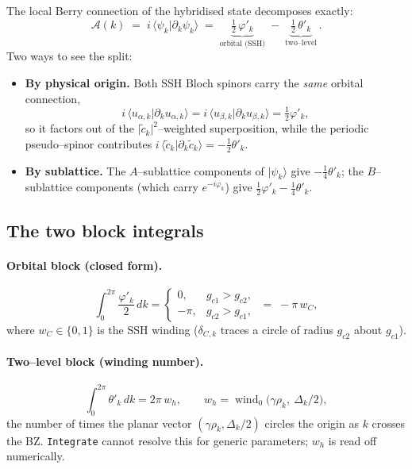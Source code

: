 \documentclass[11pt]{article}
\newcommand{\dC}{\delta_{C,k}}
\newcommand{\ph}{\varphi_k}
\newcommand{\ket}[1]{\lvert #1 \rangle}
\newcommand{\ip}[2]{\langle #1 \vert #2 \rangle}
\newcommand{\wC}{w_C}
\newcommand{\wh}{w_h}
\DeclareMathOperator{\wind}{wind}
\begin{document}
The local Berry connection of the hybridised state decomposes exactly:
\begin{equation}\label{eq:Ablocks}
  \boxed{\;
  \mathcal A(k)\;=\;i\,\ip{\psi_k}{\partial_k\psi_k}
   \;=\;\underbrace{\tfrac12\,\varphi'_k}_{\text{orbital (SSH)}}
   \;-\;\underbrace{\tfrac12\,\theta'_k}_{\text{two--level}}\,.
  \;}
\end{equation}
Two ways to see the split:
\begin{itemize}
  \item \textbf{By physical origin.} Both SSH Bloch spinors carry the \emph{same}
        orbital connection,
        \[
          i\,\ip{u_{\alpha,k}}{\partial_k u_{\alpha,k}}
          = i\,\ip{u_{\beta,k}}{\partial_k u_{\beta,k}}
          = \tfrac12\varphi'_k ,
        \]
        so it factors out of the $\lvert\tilde c_k\rvert^{2}$--weighted
        superposition, while the periodic pseudo--spinor contributes
        $i\,\ip{\tilde c_k}{\partial_k\tilde c_k}=-\tfrac12\theta'_k$.
  \item \textbf{By sublattice.} The $A$--sublattice components of $\ket{\psi_k}$
        give $-\tfrac14\theta'_k$; the $B$--sublattice components (which carry
        $e^{-i\ph}$) give $\tfrac12\varphi'_k-\tfrac14\theta'_k$.
\end{itemize}

\subsection{The two block integrals}

\paragraph{Orbital block (closed form).}
\begin{equation}\label{eq:orbint}
  \int_{0}^{2\pi}\!\frac{\varphi'_k}{2}\,dk
   =\begin{cases}
      0, & g_{c1}>g_{c2},\\[4pt]
      -\pi, & g_{c2}>g_{c1},
    \end{cases}
   \;=\;-\pi\,\wC ,
\end{equation}
where $\wC\in\{0,1\}$ is the SSH winding
($\dC$ traces a circle of radius $g_{c2}$ about $g_{c1}$).

\paragraph{Two--level block (winding number).}
\begin{equation}\label{eq:tlsint}
  \int_{0}^{2\pi}\!\theta'_k\,dk = 2\pi\,\wh,
  \qquad
  \wh=\wind_{0}\bigl(\gamma\rho_k,\ \Delta_k/2\bigr),
\end{equation}
the number of times the planar vector $(\gamma\rho_k,\Delta_k/2)$ circles the
origin as $k$ crosses the BZ. \texttt{Integrate} cannot resolve this for generic
parameters; $\wh$ is read off numerically.
\end{document}
